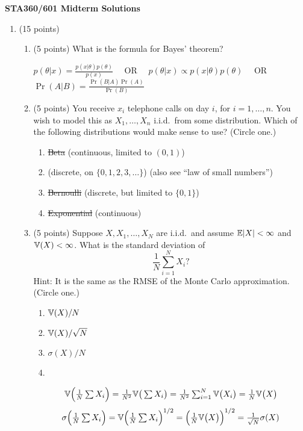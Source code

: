 \documentclass[12pt]{article}
\newcommand*\circled[1]{\tikz[baseline=(char.base)]{\node[shape=rectangle,draw,inner sep=2mm,rounded corners=2mm] (char) {#1};}}
\begin{document}
\setcounter{page}{3}
\begin{center}
\large\textbf{STA360/601 Midterm Solutions}
\end{center}

\begin{enumerate}
\item (15 points)
    \begin{enumerate}
        \setlength\itemsep{2em}
        \item (5 points) What is the formula for Bayes' theorem?

            \vspace{1em}
            $\displaystyle p(\theta|x) = \frac{p(x|\theta)p(\theta)}{p(x)}$
            ~~OR~~
            $p(\theta|x) \propto p(x|\theta)p(\theta)$
            ~~OR~~
            $\displaystyle \Pr(A|B) = \frac{\Pr(B|A)\Pr(A)}{\Pr(B)}$
        \item (5 points) You receive $x_i$ telephone calls on day $i$, for $i=1,\ldots,n$. 
            You wish to model this as $X_1,\ldots,X_n$ i.i.d.\ from some distribution.
            Which of the following distributions would make sense to use? (Circle one.)
            \vspace{1em}
            \begin{enumerate}
                \setlength\itemsep{1em}
                \item \sout{Beta} (continuous, limited to $(0,1)$)
                \item \circled{Poisson} (discrete, on $\{0,1,2,3,\ldots\}$) (also see ``law of small numbers'')
                \item \sout{Bernoulli} (discrete, but limited to $\{0,1\}$)
                \item \sout{Exponential} (continuous)
            \end{enumerate}
        \item (5 points) Suppose $X,X_1,\ldots,X_N$ are i.i.d.\ and assume $\mathbb{E}|X|<\infty$ and $\mathbb{V}(X)<\infty$.
            What is the standard deviation of $$\frac{1}{N}\sum_{i=1}^N X_i?$$
            Hint: It is the same as the RMSE of the Monte Carlo approximation. (Circle one.)
            \vspace{1em}
            \begin{enumerate}
                \setlength\itemsep{1em}
                \item $\mathbb{V}(X)/N$
                \item $\mathbb{V}(X)/\sqrt N$
                \item $\sigma(X)/N$
                \item \circled{$\sigma(X)/\sqrt N$}
            \end{enumerate}
            $$ \mathbb{V}\Big(\tfrac{1}{N}\textstyle\sum X_i\Big)
            = \tfrac{1}{N^2}\mathbb{V}\big(\textstyle\sum X_i\big) = \frac{1}{N^2}\sum_{i = 1}^N \mathbb{V}\big(X_i\big)
            = \frac{1}{N}\mathbb{V}\big(X\big)$$
            $$ \sigma\Big(\tfrac{1}{N}\textstyle\sum X_i\Big)
            = \mathbb{V}\Big(\tfrac{1}{N}\textstyle\sum X_i\Big)^{1/2}
            = \Big(\frac{1}{N}\mathbb{V}\big(X\big)\Big)^{1/2}
            = \frac{1}{\sqrt{N}}\sigma(X)$$
    \end{enumerate}


\end{enumerate}
\end{document}
